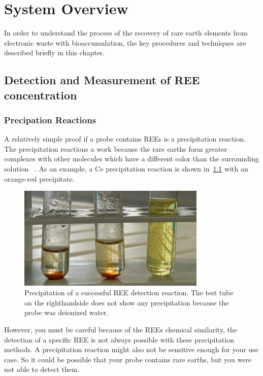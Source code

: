 \chapter{System Overview}

In order to understand the process of the recovery of rare earth elements from electronic waste with bioaccumulation, the key procedures and techniques are described briefly in this chapter.


\section{Detection and Measurement of REE concentration\authorA}

\subsection{Precipation Reactions}
A relatively simple proof if a probe contains REEs is a precipitation reaction.
The precipitation reactions a work because the rare earths form greater complexes with other molecules which have a different color than the surrounding solution ~\cite{janderblasius}.
As an example, a Ce precipitation reaction is shown in~\ref{fig:cer_precipitation_cropped} with an orange-red precipitate.

\begin{figure}[H]
    \centering
    \includegraphics[width=0.8\textwidth]{./media/images/ree_precipitation_reaction_cropped}
    \caption{Precipitation of a successful REE detection reaction. The test tube on the righthandside does not show any precipitation because the probe was deionized water.}
    \label{fig:cer_precipitation_cropped}
\end{figure}

However, you must be careful because of the REEs chemical similarity, the detection of a specific REE is not always possible with these precipitation methods.
A precipitation reaction might also not be sensitive enough for your use case.
So it could be possible that your probe contains rare earths, but you were not able to detect them.

